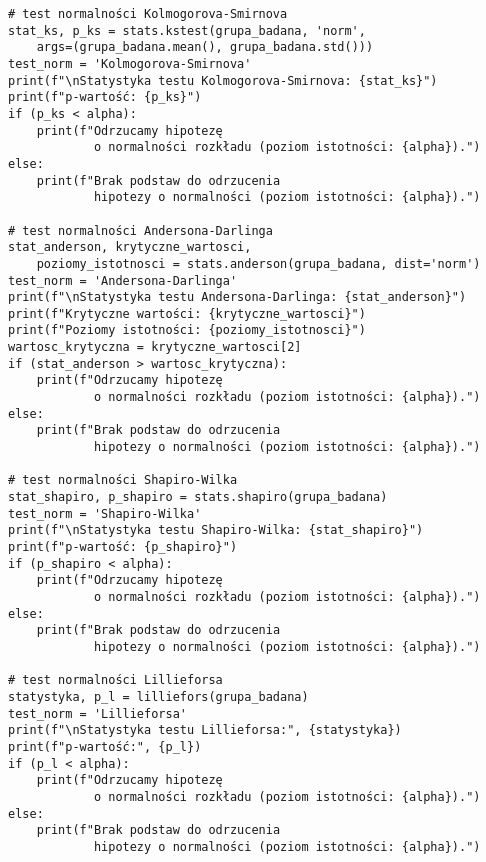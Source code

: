 \documentclass[12pt,a4paper]{article}
\begin{document}
\begin{lstlisting}
# test normalności Kolmogorova-Smirnova
stat_ks, p_ks = stats.kstest(grupa_badana, 'norm', 
    args=(grupa_badana.mean(), grupa_badana.std()))
test_norm = 'Kolmogorova-Smirnova'
print(f"\nStatystyka testu Kolmogorova-Smirnova: {stat_ks}")
print(f"p-wartość: {p_ks}")
if (p_ks < alpha):
    print(f"Odrzucamy hipotezę 
            o normalności rozkładu (poziom istotności: {alpha}).")
else:
    print(f"Brak podstaw do odrzucenia 
            hipotezy o normalności (poziom istotności: {alpha}).")

# test normalności Andersona-Darlinga
stat_anderson, krytyczne_wartosci,
    poziomy_istotnosci = stats.anderson(grupa_badana, dist='norm')
test_norm = 'Andersona-Darlinga'
print(f"\nStatystyka testu Andersona-Darlinga: {stat_anderson}")
print(f"Krytyczne wartości: {krytyczne_wartosci}")
print(f"Poziomy istotności: {poziomy_istotnosci}")
wartosc_krytyczna = krytyczne_wartosci[2]
if (stat_anderson > wartosc_krytyczna):
    print(f"Odrzucamy hipotezę 
            o normalności rozkładu (poziom istotności: {alpha}).")
else:
    print(f"Brak podstaw do odrzucenia 
            hipotezy o normalności (poziom istotności: {alpha}).")

# test normalności Shapiro-Wilka
stat_shapiro, p_shapiro = stats.shapiro(grupa_badana)
test_norm = 'Shapiro-Wilka'
print(f"\nStatystyka testu Shapiro-Wilka: {stat_shapiro}")
print(f"p-wartość: {p_shapiro}")
if (p_shapiro < alpha):
    print(f"Odrzucamy hipotezę 
            o normalności rozkładu (poziom istotności: {alpha}).")
else:
    print(f"Brak podstaw do odrzucenia 
            hipotezy o normalności (poziom istotności: {alpha}).")

# test normalności Lillieforsa
statystyka, p_l = lilliefors(grupa_badana)
test_norm = 'Lillieforsa'
print(f"\nStatystyka testu Lillieforsa:", {statystyka})
print(f"p-wartość:", {p_l})
if (p_l < alpha):
    print(f"Odrzucamy hipotezę 
            o normalności rozkładu (poziom istotności: {alpha}).")
else:
    print(f"Brak podstaw do odrzucenia 
            hipotezy o normalności (poziom istotności: {alpha}).")
\end{lstlisting}
\end{document}
